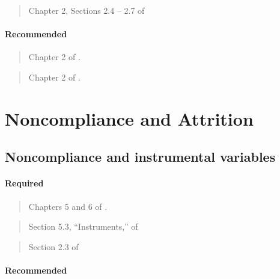 \documentclass[12pt]{article}
\begin{document}
\begin{verse}
  Chapter 2, Sections 2.4 -- 2.7 of 
\end{verse}

\paragraph*{Recommended}

\begin{verse}
  Chapter 2 of .
\end{verse}

\begin{verse}
  Chapter 2 of .
\end{verse}

\section{Noncompliance and Attrition}

\subsection{Noncompliance and instrumental variables}

\paragraph*{Required}

\begin{verse} Chapters 5 and 6 of . \end{verse}

\begin{verse}  \end{verse}

\begin{verse}
 \end{verse}

\begin{verse}
  Section 5.3, ``Instruments,'' of  \end{verse}

\begin{verse} Section 2.3 of  \end{verse}

\paragraph*{Recommended}
\end{document}
